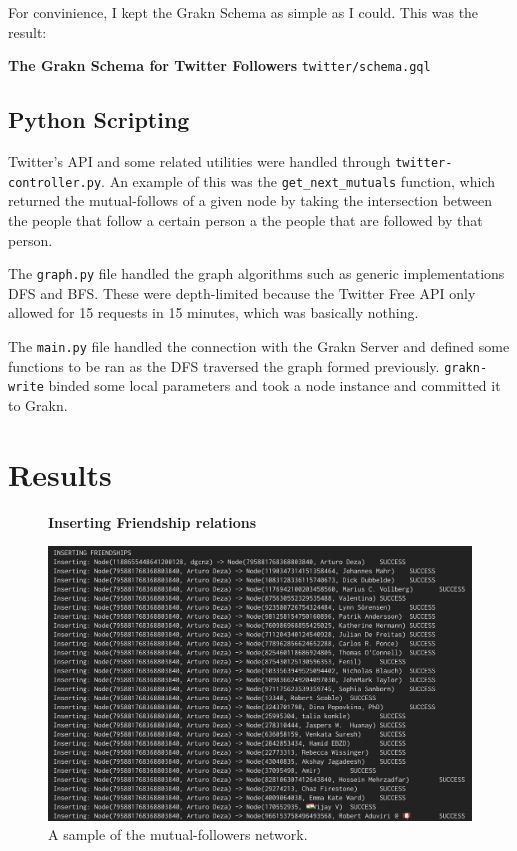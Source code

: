 \documentclass[a4 paper,12pt]{article}
\begin{document}
For convinience, I kept the Grakn Schema as simple as I could. This was the result:

\FloatBarrier
\textbf{The Grakn Schema for Twitter Followers} \texttt{twitter/schema.gql}\par\medskip
    
\FloatBarrier

\subsection{Python Scripting}

Twitter's API and some related utilities were handled through \texttt{twitter-controller.py}. An example of this was the \texttt{get\_next\_mutuals} function, which returned the mutual-follows of a given node by taking the intersection between the people that follow a certain person a the people that are followed by that person.


The \texttt{graph.py} file handled the graph algorithms such as generic implementations DFS and BFS. These were depth-limited because the Twitter Free API only allowed for 15 requests in 15 minutes, which was basically nothing.

The \texttt{main.py} file handled the connection with the Grakn Server and defined some functions to be ran as the DFS traversed the graph formed previously. \texttt{grakn-write} binded some local parameters and took a node instance and committed it to Grakn.



\section{Results}

\FloatBarrier
\begin{figure}
\centering
\textbf{Inserting Friendship relations}\par\medskip
    \includegraphics[scale=0.30]{figures/success.png}
\caption {A sample of the mutual-followers network.}
\end{figure}
\FloatBarrier
\end{document}
